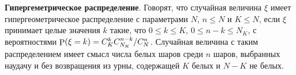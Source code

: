 \textbf{Гипергеметрическое распределение}. Говорят, что случайная величина $\xi$ имеет гипергеометрическое распределение с параметрами $N$, $n \leq N$ и $K \leq N$, если $\xi$ принимает целые значения $k$ такие, что $0 \leq k \leq K$, $0 \leq n- k \leq N _ K$, с вероятностями $\P(\xi = k) = C_K^k C_{N_K}^{n-k} / C_N^n$. 
Случайная величина с таким распределением имеет смысл числа белых шаров среди $n$ шаров, выбранных наудачу и без возвращения из урны, содержащей $K$ белых и $N-K$ не белых.


